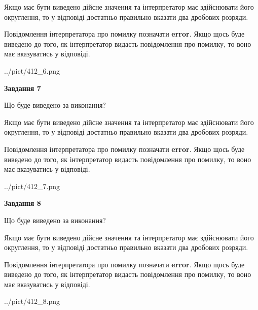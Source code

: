 \documentclass[12pt, ukrainian]{article}
\begin{document}
{\begin {Large}
Якщо має бути виведено дійсне значення та інтерпретатор має здійснювати його округлення, 
то у відповіді достатньо правильно вказати два дробових розряди.

Повідомлення інтерпретатора про помилку позначати \textbf{error}.
Якщо щось буде виведено до того, як інтерпретатор видасть повідомлення про помилку, 
то воно має вказуватись у відповіді. \par

\begin{center}
	{../pict/412_6.png}
\end{center}
\newpage

{\begin {center}\textbf{Завдання 7}\end {center}}\par
Що буде виведено за виконання? \par

Якщо має бути виведено дійсне значення та інтерпретатор має здійснювати його округлення, 
то у відповіді достатньо правильно вказати два дробових розряди.

Повідомлення інтерпретатора про помилку позначати \textbf{error}.
Якщо щось буде виведено до того, як інтерпретатор видасть повідомлення про помилку, 
то воно має вказуватись у відповіді. \par

\begin{center}
	{../pict/412_7.png}
\end{center}
\newpage

{\begin {center}\textbf{Завдання 8}\end {center}}\par
Що буде виведено за виконання? \par

Якщо має бути виведено дійсне значення та інтерпретатор має здійснювати його округлення, 
то у відповіді достатньо правильно вказати два дробових розряди.

Повідомлення інтерпретатора про помилку позначати \textbf{error}.
Якщо щось буде виведено до того, як інтерпретатор видасть повідомлення про помилку, 
то воно має вказуватись у відповіді. \par

\begin{center}
	{../pict/412_8.png}
\end{center}
\newpage


\end{Large}}
\end{document}

